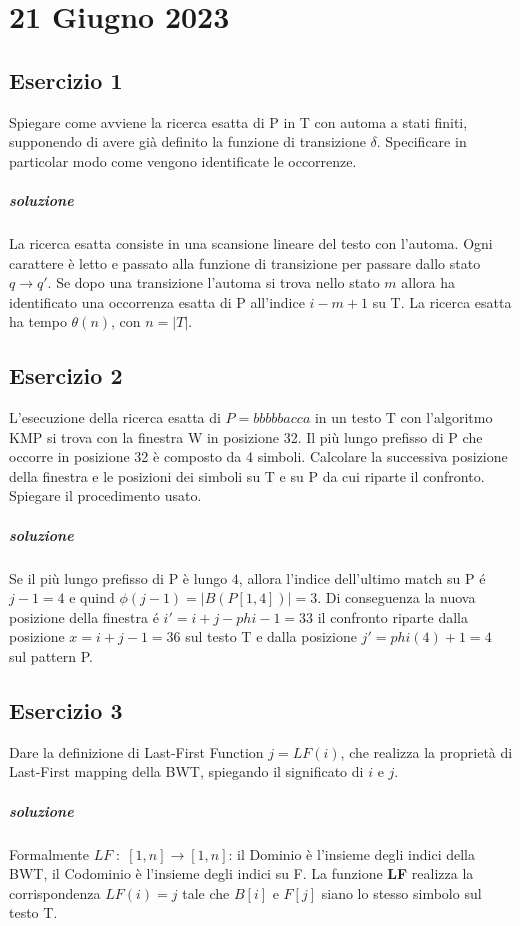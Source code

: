 \chapter{21 Giugno 2023}

\section{Esercizio 1}

Spiegare come avviene la ricerca esatta di P in T con automa a stati finiti, supponendo di avere già definito la funzione di transizione $\delta$.
Specificare in particolar modo come vengono identificate le occorrenze.

\paragraph{soluzione} La ricerca esatta consiste in una scansione lineare del testo con l'automa. Ogni carattere \`e letto e passato alla funzione di transizione per passare dallo stato $q \rightarrow q'$. Se dopo una transizione l'automa si trova nello stato $m$ allora ha identificato una occorrenza esatta di P all'indice $i-m+1$ su T. La ricerca esatta ha tempo $\theta(n)$, con $n = |T|$.

\section{Esercizio 2}

L'esecuzione della ricerca esatta di $P = bbbbbacca$ in un testo T con l'algoritmo KMP si trova con la finestra W in posizione 32.
Il pi\`u lungo prefisso di P che occorre in posizione 32 \`e composto da 4 simboli. Calcolare la successiva posizione della finestra e le posizioni dei simboli su T e su P da cui riparte il confronto.
Spiegare il procedimento usato.

\paragraph{soluzione} Se il pi\`u lungo prefisso di P \`e lungo $4$, allora l'indice dell'ultimo match su P \'e $j-1 = 4$ e quind $\phi(j-1) = |B(P[1,4])| = 3$. Di conseguenza la nuova posizione della finestra \'e $i' = i + j - phi - 1 = 33$ il confronto riparte dalla posizione $x = i + j - 1 = 36$ sul testo T e dalla posizione $j' = phi(4) + 1 = 4$ sul pattern P.

\section{Esercizio 3}

Dare la definizione di Last-First Function $j = LF(i)$, che realizza la proprietà di Last-First mapping della BWT, spiegando il significato di $i$ e $j$.

\paragraph{soluzione} Formalmente $LF \; : \; [1,n] \rightarrow [1,n]$: il Dominio \`e l'insieme degli indici della BWT, il Codominio \`e l'insieme degli indici su F. La funzione \textbf{LF} realizza la corrispondenza $LF(i) = j$ tale che $B[i]$ e $F[j]$ siano lo stesso simbolo sul testo T.
